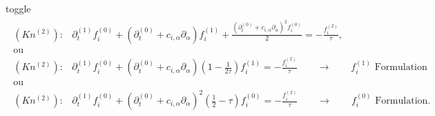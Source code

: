 \documentclass[letterpaper,10pt,english,openany,oneside]{jupyterBook}
\begin{document}
\begin{sphinxuseclass}{toggle}
\begin{equation}
\begin{split}
\begin{array}{ll}
    (Kn^{(2)}):& \partial_{t}^{(1)} f_{i}^{(0)} + \left( \partial_{t}^{(0)} + c_{i,\alpha}\partial_{\alpha} \right)f_{i}^{(1)} + \displaystyle\frac{\left( \partial_{t}^{(0)} + c_{i,\alpha}\partial_{\alpha} \right)^{2} f_{i}^{(0)}}{2}= - \displaystyle\frac{ f_{i}^{(2)} }{ \tau },\\
    \textrm{ou}&  \\
    (Kn^{(2)}):& \partial_{t}^{(1)} f_{i}^{(0)} + \left( \partial_{t}^{(0)} + c_{i,\alpha}\partial_{\alpha} \right)\displaystyle\left(1 - \frac{1}{2\tau}\right) f_{i}^{(1)} =  - \displaystyle\frac{ f_{i}^{(2)} }{ \tau } \quad\quad \rightarrow \quad\quad  f_{i}^{(1)}\textrm{ Formulation} \\
    \textrm{ou}& \\
    (Kn^{(2)}):& \partial_{t}^{(1)} f_{i}^{(0)} + \left( \partial_{t}^{(0)} + c_{i,\alpha}\partial_{\alpha} \right)^{2} \displaystyle\left(\frac{1}{2} - \tau\right) f_{i}^{(0)} =  - \displaystyle\frac{ f_{i}^{(2)} }{ \tau } \quad\quad \rightarrow  \quad\quad f_{i}^{(0)}\textrm{ Formulation}.
 \end{array}
\end{split}
\end{equation}
\sphinxAtStartPar
{}


\end{sphinxuseclass}
\end{document}
